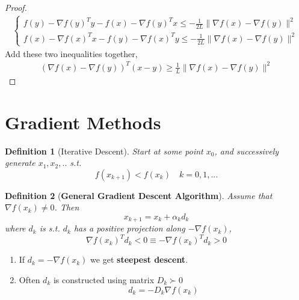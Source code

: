 \documentclass[11pt,a4paper]{article}
\newtheorem{definition}{Definition}
\begin{document}
\begin{proof}
\begin{equation}
    \begin{aligned}
        \left\{\begin{matrix}
            f(y)-\nabla f(y)^Ty-f(x)-\nabla f(y)^Tx\leq -\frac{1}{2L}\|\nabla f(x)-\nabla f(y)\|^2\\
            f(x)-\nabla f(x)^Tx-f(y)-\nabla f(x)^Ty\leq -\frac{1}{2L}\|\nabla f(x)-\nabla f(y)\|^2
        \end{matrix}\right.
    \end{aligned}
    \nonumber
\end{equation}
Add these two inequalities together,
\begin{equation}
    \begin{aligned}
        (\nabla f(x)-\nabla f(y))^T(x-y)\geq \frac{1}{L}\|\nabla f(x)-\nabla f(y)\|^2
    \end{aligned}
    \nonumber
\end{equation}
\end{proof}











\section{Gradient Methods}
\begin{definition}[Iterative Descent]
Start at some point $x_0$, and successively generate $x_1,x_2,..$ s.t. $$f(x_{k+1})<f(x_k)\quad k=0,1,...$$
\end{definition}

\begin{definition}[\textbf{General Gradient Descent Algorithm}]
    Assume that $\nabla f(x_k)\neq 0$. Then
    $$x_{k+1}=x_k+\alpha_k d_k$$
    where $d_k$ is s.t. $d_k$ has a positive projection along $-\nabla f(x_k)$,
    $$\nabla f(x_k)^T d_k<0 \equiv -\nabla f(x_k)^T d_k>0$$
\end{definition}
\begin{enumerate}[$\bullet$]
    \item If $d_k=-\nabla f(x_k)$ we get \textbf{steepest descent}.
    \item Often $d_k$ is constructed using matrix $D_k \succ 0$ $$d_k=-D_k\nabla f(x_k)$$
\end{enumerate}
\end{document}
